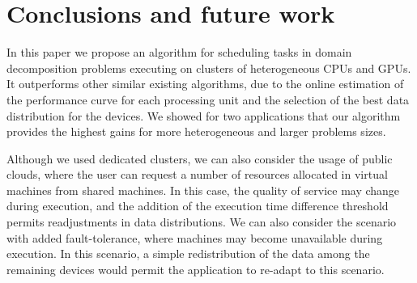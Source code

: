 \documentclass[journal]{IEEEtran}
\begin{document}




\section{Conclusions and future work}

In this paper we propose an algorithm for scheduling tasks in domain
decomposition problems executing on clusters of heterogeneous CPUs and GPUs. It
outperforms other similar existing algorithms, due to the online estimation of
the performance curve for each processing unit and the selection of the best
data distribution for the devices. We showed for two applications that our
algorithm provides the highest gains for more heterogeneous and larger problems
sizes.

Although we used dedicated clusters, we can also consider the usage of public
clouds, where the user can request a number of resources allocated in virtual
machines from shared machines. In this case, the quality of service may change
during execution, and the addition of the execution time difference threshold
permits readjustments in data distributions. We can also consider the scenario
with added fault-tolerance, where machines may become unavailable during
execution. In this scenario, a simple redistribution of the data among the
remaining devices would permit the application to re-adapt to this scenario.
\end{document}
